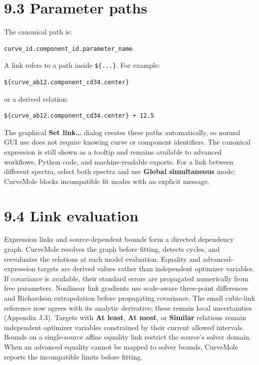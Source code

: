 \documentclass[
  10pt,
  a4paper,
  oneside]{scrreprt}
\begin{document}
\hypertarget{parameter-paths}{%
\section{9.3 Parameter paths}\label{parameter-paths}}

The canonical path is:

\begin{verbatim}
curve_id.component_id.parameter_name
\end{verbatim}

A link refers to a path inside \texttt{\$\{...\}}. For example:

\begin{verbatim}
${curve_ab12.component_cd34.center}
\end{verbatim}

or a derived relation:

\begin{verbatim}
${curve_ab12.component_cd34.center} + 12.5
\end{verbatim}

The graphical \textbf{Set link\ldots{}} dialog creates these paths
automatically, so normal GUI use does not require knowing curve or
component identifiers. The canonical expression is still shown as a
tooltip and remains available to advanced workflows, Python code, and
machine-readable exports. For a link between different spectra, select
both spectra and use \textbf{Global simultaneous} mode; CurveMole blocks
incompatible fit modes with an explicit message.

\hypertarget{link-evaluation}{%
\section{9.4 Link evaluation}\label{link-evaluation}}

Expression links and source-dependent bounds form a directed dependency
graph. CurveMole resolves the graph before fitting, detects cycles, and
reevaluates the relations at each model evaluation. Equality and
advanced-expression targets are derived values rather than independent
optimizer variables. If covariance is available, their standard errors
are propagated numerically from free parameters. Nonlinear link
gradients use scale-aware three-point differences and Richardson
extrapolation before propagating covariance. The small cubic-link
reference now agrees with its analytic derivative; these remain local
uncertainties (Appendix J.3). Targets with \textbf{At least}, \textbf{At
most}, or \textbf{Similar} relations remain independent optimizer
variables constrained by their current allowed intervals. Bounds on a
single-source affine equality link restrict the source's solver domain.
When an advanced equality cannot be mapped to solver bounds, CurveMole
reports the incompatible limits before fitting.
\end{document}
